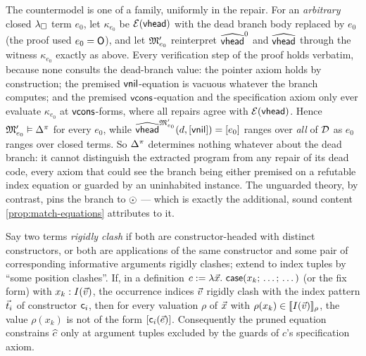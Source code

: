 \begin{remark}
\label{rem:repair-family}
The countermodel is one of a family, uniformly in the repair.  For an
\emph{arbitrary} closed $\lambda_{\square}$ term $e_0$, let $\kappa_{e_0}$ be
$\mathcal{E}(\mathsf{vhead})$ with the dead branch body replaced by $e_0$
(the proof used $e_0 = \mathsf{O}$), and let $\mathfrak{M}'_{e_0}$ reinterpret
$\widehat{\mathsf{vhead}}^0$ and $\widehat{\mathsf{vhead}}$ through the
witness $\kappa_{e_0}$ exactly as above.  Every verification step of
the proof holds verbatim, because none consults the dead-branch value:
the pointer axiom holds by construction; the premised
$\mathsf{vnil}$-equation is vacuous whatever the branch computes; and the
premised $\mathsf{vcons}$-equation and the specification axiom only ever
evaluate $\kappa_{e_0}$ at $\mathsf{vcons}$-forms, where all repairs agree
with $\mathcal{E}(\mathsf{vhead})$.  Hence $\mathfrak{M}'_{e_0} \vDash \Delta^\pi$ for
every $e_0$, while $\widehat{\mathsf{vhead}}^{\mathfrak{M}'_{e_0}}(d,
[\mathsf{vnil}]) = [e_0]$ ranges over \emph{all} of $\mathcal{D}$ as $e_0$
ranges over closed terms.  So $\Delta^\pi$ determines nothing whatever
about the dead branch: it cannot distinguish the extracted program
from any repair of its dead code, every axiom that could see the
branch being either premised on a refutable index equation or guarded
by an uninhabited instance.  The unguarded theory, by contrast, pins
the branch to $\odot$ --- which is exactly the additional, sound
content \cref{prop:match-equations} attributes to it.
\end{remark}

\begin{proposition}
\label{prop:pruning}
Say two terms \emph{rigidly clash} if both are constructor-headed with
distinct constructors, or both are applications of the same constructor
and some pair of corresponding informative arguments rigidly clashes;
extend to index tuples by ``some position clashes''.  If, in a
definition $c \defeq \lambda \tup{x}.\ \tcase{x_k}{\dots}{\dots}$ (or
the fix form) with $x_k : I(\vec{v})$, the occurrence indices $\vec{v}$
rigidly clash with the index pattern $\vec{t}_i$ of constructor
$\mathsf{c}_i$, then for every valuation $\rho$ of $\vec{x}$ with
$\rho(x_k) \in [\![ I(\vec{v}) ]\!]_{\rho}$, the value $\rho(x_k)$ is not of
the form $[\mathsf{c}_i(\vec{e})]$.  Consequently the pruned equation
constrains $\widehat{c}$ only at argument tuples excluded by the guards of
$c$'s specification axiom.
\end{proposition}

